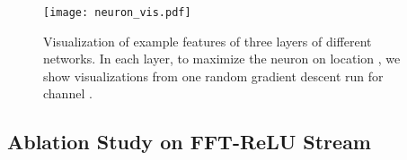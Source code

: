 \documentclass[letterpaper]{article} \usepackage{aaai23}  \usepackage{times}  \usepackage{helvet}  \usepackage{courier}  \usepackage[hyphens]{url}  \usepackage{graphicx} \usepackage{enumitem}
\begin{document}
\begin{figure}[t]
\begin{center}
    \texttt{[image: neuron\_vis.pdf]}
\end{center}
\caption{Visualization of example features of three layers of different networks. In each layer, to maximize the neuron on location , we show visualizations from one random gradient descent run for channel .} 
\label{fig:neuron_vis}
\end{figure}

\subsection{Ablation Study on FFT-ReLU Stream}

\begin{table}[t]
\renewcommand\arraystretch{0.9}
\footnotesize
\centering
\caption{Ablation on FFT-ReLU stream on GoPro dataset with RSNet \cite{Nah2017deep}. ``Real'' means the weights in 11 convolution are all real values, instead of the default complex values. ``Concat'' means after applying FFT, we concatenate the real part  and the imaginary part  along the channel dimension, so the weights of subsequent convolution operations are all real values. \colorbox{gray!20}{Gray} areas indicate RSNet and RSNet w/ FFT-ReLU stream. Results worse than RSNet are in \textit{italics}.}
\label{tab:ablation-fft-relu}
\end{table}
\end{document}
